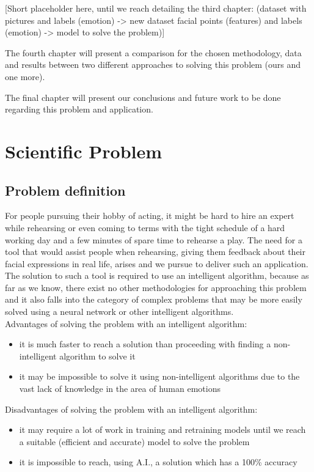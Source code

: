 \documentclass[runningheads,a4paper,11pt]{report}
\begin{document}
[Short placeholder here, until we reach detailing the third chapter: (dataset with pictures and labels (emotion) -> new dataset facial points (features) and labels (emotion) -> model to solve the problem)]

The fourth chapter will present a comparison for the chosen methodology, data and results between two different approaches to solving this problem (ours and one more).

The final chapter will present our conclusions and future work to be done regarding this problem and application.

\chapter{Scientific Problem}
\label{section:scientificProblem}


\section{Problem definition}
\label{section:problemDefinition}

For people pursuing their hobby of acting, it might be hard to hire an expert while rehearsing or even coming to terms with the tight schedule of a hard working day and a few minutes of spare time to rehearse a play. The need for a tool that would assist people when rehearsing, giving them feedback about their facial expressions in real life, arises and we pursue to deliver such an application.\\
The solution to such a tool is required to use an intelligent algorithm, because as far as we know, there exist no other methodologies for approaching this problem and it also falls into the category of complex problems that may be more easily solved using a neural network or other intelligent algorithms.\\

Advantages of solving the problem with an intelligent algorithm:
\begin{itemize}
	\item it is much faster to reach a solution than proceeding with finding a non-intelligent algorithm to solve it
 	\item it may be impossible to solve it using non-intelligent algorithms due to the vast lack of knowledge in the area of human emotions
\end{itemize}

Disadvantages of solving the problem with an intelligent algorithm:
\begin{itemize}
	\item it may require a lot of work in training and retraining models until we reach a suitable (efficient and accurate) model to solve the problem
	\item it is impossible to reach, using A.I., a solution which has a 100\% accuracy
\end{itemize}
\end{document}
